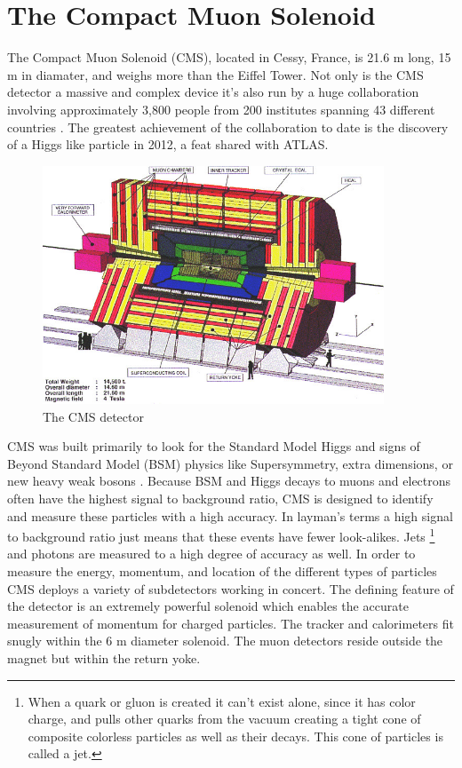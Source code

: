 \section{The Compact Muon Solenoid}

The Compact Muon Solenoid (CMS), located in Cessy, France, is 21.6 m long, 15 m in diamater, and weighs more than the Eiffel Tower. Not only is the CMS detector a massive and complex device it's also run by a huge collaboration involving approximately 3,800 people from 200 institutes spanning 43 different countries \cite{cmscollab}. The greatest achievement of the collaboration to date is the discovery of a Higgs like particle in 2012, a feat shared with ATLAS.

\begin{figure}[h!]
  \centering
  \includegraphics[width=4in]{images/CMSdetc3D.jpg}
  \caption
   {The CMS detector \cite{cmsweb}}
  \label{fig:cmsdet3d}
\end{figure}

CMS was built primarily to look for the Standard Model Higgs and signs of Beyond Standard Model (BSM) physics like Supersymmetry, extra dimensions, or new heavy weak bosons \cite{tdr}. Because BSM and Higgs decays to muons and electrons often have the highest signal to background ratio, CMS is designed to identify and measure these particles with a high accuracy. In layman's terms a high signal to background ratio just means that these events have fewer look-alikes. Jets \footnote{When a quark or gluon is created it can't exist alone, since it has color charge, and pulls other quarks from the vacuum creating a tight cone of composite colorless particles as well as their decays. This cone of particles is called a jet.} and photons are measured to a high degree of accuracy as well. In order to measure the energy, momentum, and location of the different types of particles CMS deploys a variety of subdetectors working in concert. The defining feature of the detector is an extremely powerful solenoid which enables the accurate measurement of momentum for charged particles. The tracker and calorimeters fit snugly within the 6 m diameter solenoid. The muon detectors reside outside the magnet but within the return yoke.

